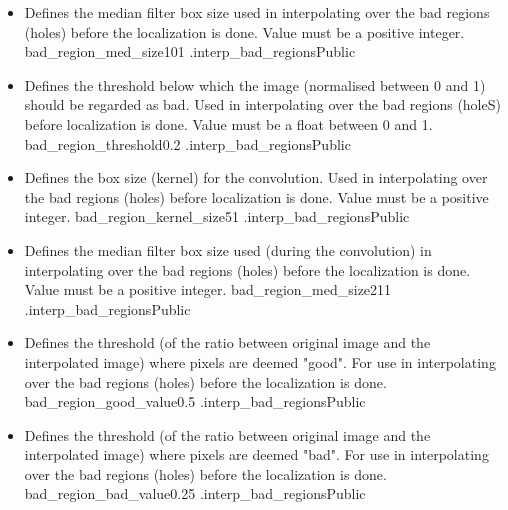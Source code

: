 \begin{itemize}
\item {}
{Defines the median filter box size used in interpolating over the bad regions (holes) before the localization is done. Value must be a positive integer.}
{bad\_region\_med\_size}{101}
{\callocRAW}{\constantsfile}
{\spirouImage.interp\_bad\_regions}{Public}

\item {}
{Defines the threshold below which the image (normalised between 0 and 1) should be regarded as bad. Used in interpolating over the bad regions (holeS) before localization is done. Value must be a float between 0 and 1.}
{bad\_region\_threshold}{0.2}
{\callocRAW}{\constantsfile}
{\spirouImage.interp\_bad\_regions}{Public}

\item {}
{Defines the box size (kernel) for the convolution. Used in interpolating over the bad regions (holes) before localization is done. Value must be a positive integer.}
{bad\_region\_kernel\_size}{51}
{\callocRAW}{\constantsfile}
{\spirouImage.interp\_bad\_regions}{Public}

\item {}
{Defines the median filter box size used  (during the convolution) in interpolating over the bad regions (holes) before the localization is done. Value must be a positive integer.}
{bad\_region\_med\_size2}{11}
{\callocRAW}{\constantsfile}
{\spirouImage.interp\_bad\_regions}{Public}

\item {}
{Defines the threshold (of the ratio between original image and the interpolated image) where pixels are deemed "good". For use in interpolating over the bad regions (holes) before the localization is done.}
{bad\_region\_good\_value}{0.5}
{\callocRAW}{\constantsfile}
{\spirouImage.interp\_bad\_regions}{Public}

\item {}
{Defines the threshold (of the ratio between original image and the interpolated image) where pixels are deemed "bad". For use in interpolating over the bad regions (holes) before the localization is done.}
{bad\_region\_bad\_value}{0.25}
{\callocRAW}{\constantsfile}
{\spirouImage.interp\_bad\_regions}{Public}


\end{itemize}

